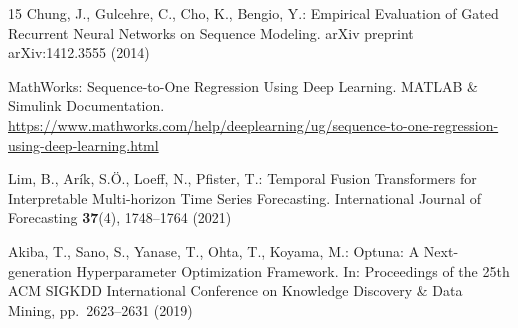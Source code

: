 \documentclass[runningheads]{llncs}
\begin{document}
\begin{thebibliography}{15}
Chung, J., Gulcehre, C., Cho, K., Bengio, Y.:
Empirical Evaluation of Gated Recurrent Neural Networks on Sequence Modeling.
arXiv preprint arXiv:1412.3555 (2014)

MathWorks:
Sequence-to-One Regression Using Deep Learning.
MATLAB \& Simulink Documentation.
\url{https://www.mathworks.com/help/deeplearning/ug/sequence-to-one-regression-using-deep-learning.html}

Lim, B., Ar\'{i}k, S.\"{O}., Loeff, N., Pfister, T.:
Temporal Fusion Transformers for Interpretable Multi-horizon Time Series Forecasting.
International Journal of Forecasting \textbf{37}(4), 1748--1764 (2021)

Akiba, T., Sano, S., Yanase, T., Ohta, T., Koyama, M.:
Optuna: A Next-generation Hyperparameter Optimization Framework.
In: Proceedings of the 25th ACM SIGKDD International Conference on Knowledge Discovery
\& Data Mining, pp.~2623--2631 (2019)

\end{thebibliography}
\end{document}

